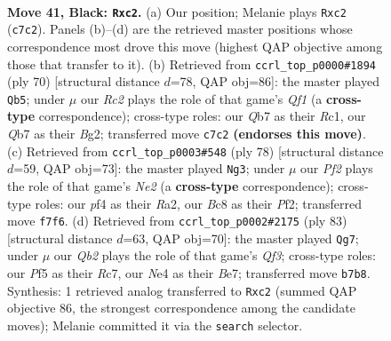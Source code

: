 \documentclass[11pt]{article}
\begin{document}
\clearpage

\begin{figure}[p]\centering
\begin{subfigure}{0.46\textwidth}\centering
\resizebox{\linewidth}{!}{%
\newchessgame
\chessboard[
  setfen={2b3k1/1qr2p1p/6p1/1B2Pp2/pQ2nP2/7N/P1P3PP/1R3K2 b - - 19 41},
  showmover=false,
  pgfstyle=straightmove, color=movearrow, markmove={c7-c2}
]}
\caption{}
\end{subfigure}\hfill
\begin{subfigure}{0.46\textwidth}\centering
\resizebox{\linewidth}{!}{%
\newchessgame
\chessboard[
  setfen={2r2q1k/6p1/1pn1b2p/p2p4/3P2N1/1P2P2P/5PB1/2R2QK1 w - - 7 36},
  showmover=false,
  pgfstyle=straightmove, color=movearrow, markmove={f1-b5}
]}
\caption{}
\end{subfigure}
\\[4pt]
\begin{subfigure}{0.46\textwidth}\centering
\resizebox{\linewidth}{!}{%
\newchessgame
\chessboard[
  setfen={1r4k1/5p2/1q1p1npb/p2Pp3/Q3P2B/2P4P/R3NPPK/8 w - - 5 40},
  showmover=false,
  pgfstyle=straightmove, color=movearrow, markmove={e2-g3}
]}
\caption{}
\end{subfigure}\hfill
\begin{subfigure}{0.46\textwidth}\centering
\resizebox{\linewidth}{!}{%
\newchessgame
\chessboard[
  setfen={8/2r1b2k/p2p1qpn/2p4p/2P1QP1N/1P5P/P4B2/3R2K1 b - - 9 42},
  showmover=false,
  pgfstyle=straightmove, color=movearrow, markmove={f6-g7}
]}
\caption{}
\end{subfigure}
\caption{\textbf{Move 41, Black: \texttt{Rxc2}.} (a) Our position; Melanie plays \texttt{Rxc2} (\texttt{c7c2}). Panels (b)--(d) are the retrieved master positions whose correspondence most drove this move (highest QAP objective among those that transfer to it). (b) Retrieved from \texttt{ccrl\_top\_p0000\#1894} (ply 70) [structural distance $d$=78, QAP obj=86]: the master played \texttt{Qb5}; under $\mu$ our \emph{Rc2} plays the role of that game's \emph{Qf1} (a \textbf{cross-type} correspondence); cross-type roles: our \emph{Q}b7 as their \emph{R}c1, our \emph{Q}b7 as their \emph{B}g2; transferred move \texttt{c7c2} \textbf{(endorses this move)}. (c) Retrieved from \texttt{ccrl\_top\_p0003\#548} (ply 78) [structural distance $d$=59, QAP obj=73]: the master played \texttt{Ng3}; under $\mu$ our \emph{Pf2} plays the role of that game's \emph{Ne2} (a \textbf{cross-type} correspondence); cross-type roles: our \emph{p}f4 as their \emph{R}a2, our \emph{B}c8 as their \emph{P}f2; transferred move \texttt{f7f6}. (d) Retrieved from \texttt{ccrl\_top\_p0002\#2175} (ply 83) [structural distance $d$=63, QAP obj=70]: the master played \texttt{Qg7}; under $\mu$ our \emph{Qb2} plays the role of that game's \emph{Qf3}; cross-type roles: our \emph{P}f5 as their \emph{R}c7, our \emph{N}e4 as their \emph{B}e7; transferred move \texttt{b7b8}. Synthesis: 1 retrieved analog transferred to \texttt{Rxc2} (summed QAP objective 86, the strongest correspondence among the candidate moves); Melanie committed it via the \texttt{search} selector.}
\label{fig:thought-m81}
\end{figure}
\end{document}
